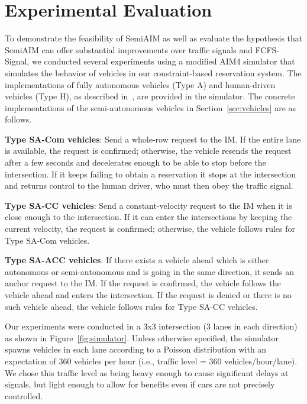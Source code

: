 \section{Experimental Evaluation}
\label{sec:simulation}

To demonstrate the feasibility of SemiAIM as well as evaluate the
hypothesis that SemiAIM can offer substantial improvements over
traffic signals and FCFS-Signal, we conducted several experiments
using a modified AIM4 simulator that simulates the behavior of
vehicles in our constraint-based reservation system.  The
implementations of fully autonomous vehicles (Type A) and human-driven
vehicles (Type H), as described in~\cite{bib:Dresner08Multiagent}, are
provided in the simulator. The concrete implementations of the
semi-autonomous vehicles in Section~\ref{sec:vehicles} are as follows.

\begin{small_ind_s_itemize}

\item \textbf{Type SA-Com vehicles}:
Send a whole-row request to the IM.  If the entire lane is available,
the request is confirmed; otherwise, the vehicle resends the request
after a few seconds and decelerates enough to be able to stop before
the intersection.  If it keeps failing to obtain a reservation it
stops at the intersection and returns control to the human driver, who
must then obey the traffic signal.

\item \textbf{Type SA-CC vehicles}:
Send a constant-velocity request to the IM when it is close
enough to the intersection. If it can enter the intersections by
keeping the current velocity, the request is confirmed; otherwise, the
vehicle follows rules for Type SA-Com vehicles.

\item \textbf{Type SA-ACC vehicles}: If there exists a vehicle ahead
which is either autonomous or semi-autonomous and is going in the same
direction, it sends an anchor request to the IM.  If the request is
confirmed, the vehicle follows the vehicle ahead and enters the
intersection.  If the request is denied or there is no such vehicle
ahead, the vehicle follows rules for Type SA-CC vehicles.

\end{small_ind_s_itemize}

\noindent
Our experiments were conducted in a 3x3 intersection (3 lanes in each
direction) as shown in Figure~\ref{fig:simulator}.  Unless otherwise
specified, the simulator spawns vehicles in each lane according to a
Poisson distribution with an expectation of 360 vehicles per hour
(i.e., traffic level = 360 vehicles/hour/lane).  We chose this traffic
level as being heavy enough to cause significant delays at signals,
but light enough to allow for benefits even if cars are not precisely
controlled.

